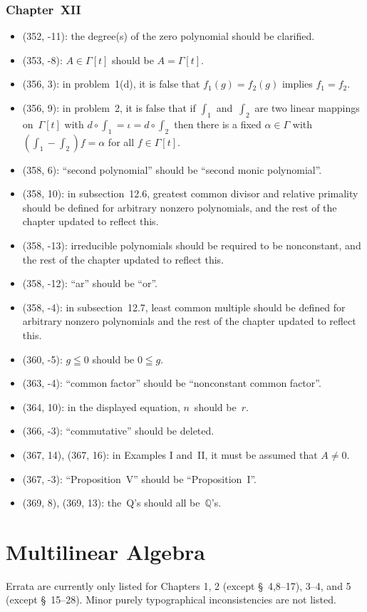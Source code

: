 \documentclass[letterpaper,12pt]{article}
\newcommand{\Q}{\mathbb{Q}}
\newcommand{\after}{\circ}
\begin{document}
\section*{Chapter~XII}
\begin{itemize}
\item (352, -11): the degree(s) of the zero polynomial should be clarified.
\item (353, -8): \(A\in\Gamma[t]\) should be \(A=\Gamma[t]\).
\item (356, 3): in problem~1(d), it is false that \(f_1(g)=f_2(g)\) implies \(f_1=f_2\).
\item (356, 9): in problem~2, it is false that if \(\int_1\) and~\(\int_2\) are two linear mappings on~\(\Gamma[t]\) with \(d\after\int_1=\iota=d\after\int_2\) then there is a fixed \(\alpha\in\Gamma\) with \((\int_1-\int_2)f=\alpha\) for all \(f\in\Gamma[t]\).
\item (358, 6): ``second polynomial'' should be ``second monic polynomial''.
\item (358, 10): in subsection~12.6, greatest common divisor and relative primality should be defined for arbitrary nonzero polynomials, and the rest of the chapter updated to reflect this.
\item (358, -13): irreducible polynomials should be required to be nonconstant, and the rest of the chapter updated to reflect this.
\item (358, -12): ``ar'' should be ``or''.
\item (358, -4): in subsection~12.7, least common multiple should be defined for arbitrary nonzero polynomials and the rest of the chapter updated to reflect this.
\item (360, -5): \(g\leqq 0\) should be \(0\leqq g\).
\item (363, -4): ``common factor'' should be ``nonconstant common factor''.
\item (364, 10): in the displayed equation, \(n\)~should be~\(r\).
\item (366, -3): ``commutative'' should be deleted.
\item (367, 14), (367, 16): in Examples I and~II, it must be assumed that \(A\ne 0\).
\item (367, -3): ``Proposition~V'' should be ``Proposition~I''.
\item (369, 8), (369, 13): the~Q's should all be~\(\Q\)'s.
\end{itemize}

\newpage
\part*{Multilinear Algebra}
Errata are currently only listed for Chapters 1, 2 (except \S~4,8--17), 3--4, and 5 (except \S~15--28). Minor purely typographical inconsistencies are not listed.
\end{document}

